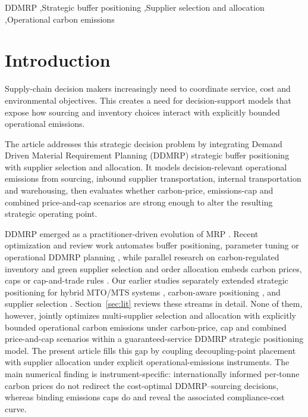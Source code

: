 \documentclass[preprint,12pt,authoryear]{elsarticle}
\begin{document}
\begin{frontmatter}
\begin{keyword}
DDMRP \sep Strategic buffer positioning \sep Supplier selection and allocation \sep Operational carbon emissions


\end{keyword}

\end{frontmatter}


\section{Introduction}\label{Intro}
Supply-chain decision makers increasingly need to coordinate service, cost and environmental objectives. This creates a need for decision-support models that expose how sourcing and inventory choices interact with explicitly bounded operational emissions.

The article addresses this strategic decision problem by integrating Demand Driven Material Requirement Planning (DDMRP) strategic buffer positioning with supplier selection and allocation. It models decision-relevant operational emissions from sourcing, inbound supplier transportation, internal transportation and warehousing, then evaluates whether carbon-price, emissions-cap and combined price-and-cap scenarios are strong enough to alter the resulting strategic operating point.

DDMRP emerged as a practitioner-driven evolution of MRP \citep{ptak2019}. Recent optimization and review work automates buffer positioning, parameter tuning or operational DDMRP planning \citep{martin2023,younespour2024,habbadi2025,muyulema2025}, while parallel research on carbon-regulated inventory and green supplier selection and order allocation embeds carbon prices, caps or cap-and-trade rules \citep{absi2013,benjaafar2013,Choi2013,dekker2012,mirzaee2023,hamdan2023,shi2025}. Our earlier studies separately extended strategic positioning for hybrid MTO/MTS systems \citep{achergui1,achergui2}, carbon-aware positioning \citep{achergui3}, and supplier selection \citep{ACHERGUI4}. Section~\ref{sec:lit} reviews these streams in detail. None of them, however, jointly optimizes multi-supplier selection and allocation with explicitly bounded operational carbon emissions under carbon-price, cap and combined price-and-cap scenarios within a guaranteed-service DDMRP strategic positioning model. The present article fills this gap by coupling decoupling-point placement with supplier allocation under explicit operational-emissions instruments. The main numerical finding is instrument-specific: internationally informed per-tonne carbon prices do not redirect the cost-optimal DDMRP--sourcing decisions, whereas binding emissions caps do and reveal the associated compliance-cost curve.
\end{document}
